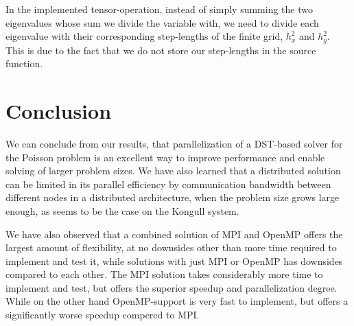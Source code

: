 \documentclass[fontsize=11pt,paper=a4,titlepage]{article}
\begin{document}
In the implemented tensor-operation, instead of simply summing the two
eigenvalues whose sum we divide the variable with, we need to divide each
eigenvalue with their corresponding step-lengths of the finite grid, $h_x^2$ and
$h_y^2$. This is due to the fact that we do not store our step-lengths in the
source function.

\section{Conclusion}
We can conclude from our results, that parallelization of a DST-based solver for the Poisson problem is an excellent way to improve performance and enable solving of larger problem sizes. We have also learned that a distributed solution can be limited in its parallel efficiency by communication bandwidth between different nodes in a distributed architecture, when the problem size grows large enough, as seems to be the case on the Kongull system.

We have also observed that a combined solution of MPI and OpenMP offers the largest amount of flexibility, at no downsides other than more time required to implement and test it, while solutions with just MPI or OpenMP has downsides compared to each other. The MPI solution takes considerably more time to implement and test, but offers the superior speedup and parallelization degree. While on the other hand OpenMP-support is very fast to implement, but offers a significantly worse speedup compered to MPI.




{}

\end{document}
